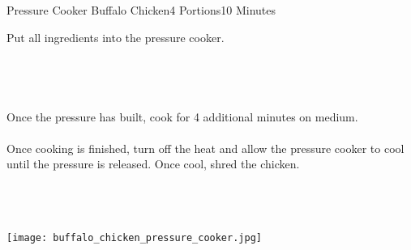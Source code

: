 \begin{recipe}{Pressure Cooker Buffalo Chicken}{4 Portions}{10 Minutes}

Put all ingredients into the pressure cooker.\\~\\~\\~\\~\\

\newstep
Once the pressure has built, cook for 4 additional minutes on medium.\\~\\

\newstep
Once cooking is finished, turn off the heat and allow the pressure cooker to cool until the pressure is released. Once cool, shred the chicken.

\end{recipe}

\begin{center}
~\\~\\~\\
\texttt{[image: buffalo\_chicken\_pressure\_cooker.jpg]}
\end{center}